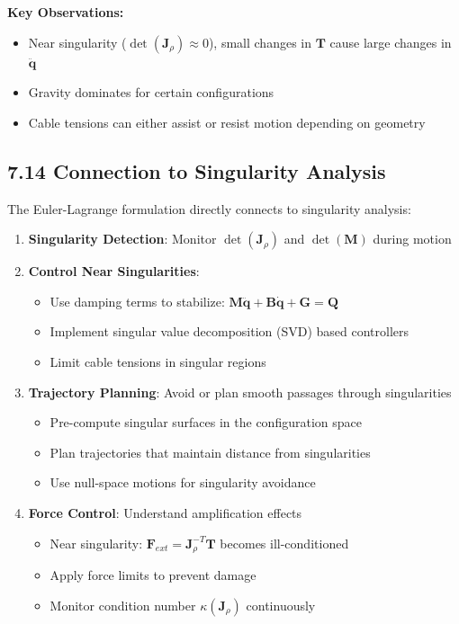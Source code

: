 \textbf{Key Observations:}
\begin{itemize}
    \item Near singularity ($\det(\mathbf{J}_{\rho}) \approx 0$), small changes in $\mathbf{T}$ cause large changes in $\ddot{\mathbf{q}}$
    \item Gravity dominates for certain configurations
    \item Cable tensions can either assist or resist motion depending on geometry
\end{itemize}

\subsection{7.14 Connection to Singularity Analysis}

The Euler-Lagrange formulation directly connects to singularity analysis:

\begin{enumerate}
    \item \textbf{Singularity Detection}: Monitor $\det(\mathbf{J}_{\rho})$ and $\det(\mathbf{M})$ during motion
    
    \item \textbf{Control Near Singularities}: 
    \begin{itemize}
        \item Use damping terms to stabilize: $\mathbf{M} \ddot{\mathbf{q}} + \mathbf{B} \dot{\mathbf{q}} + \mathbf{G} = \mathbf{Q}$
        \item Implement singular value decomposition (SVD) based controllers
        \item Limit cable tensions in singular regions
    \end{itemize}
    
    \item \textbf{Trajectory Planning}: Avoid or plan smooth passages through singularities
    \begin{itemize}
        \item Pre-compute singular surfaces in the configuration space
        \item Plan trajectories that maintain distance from singularities
        \item Use null-space motions for singularity avoidance
    \end{itemize}
    
    \item \textbf{Force Control}: Understand amplification effects
    \begin{itemize}
        \item Near singularity: $\mathbf{F}_{ext} = \mathbf{J}_{\rho}^{-T} \mathbf{T}$ becomes ill-conditioned
        \item Apply force limits to prevent damage
        \item Monitor condition number $\kappa(\mathbf{J}_{\rho})$ continuously
    \end{itemize}
\end{enumerate}

